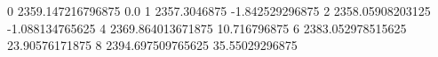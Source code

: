 0 2359.147216796875 0.0
1 2357.3046875 -1.842529296875
2 2358.05908203125 -1.088134765625
4 2369.864013671875 10.716796875
6 2383.052978515625 23.90576171875
8 2394.697509765625 35.55029296875
